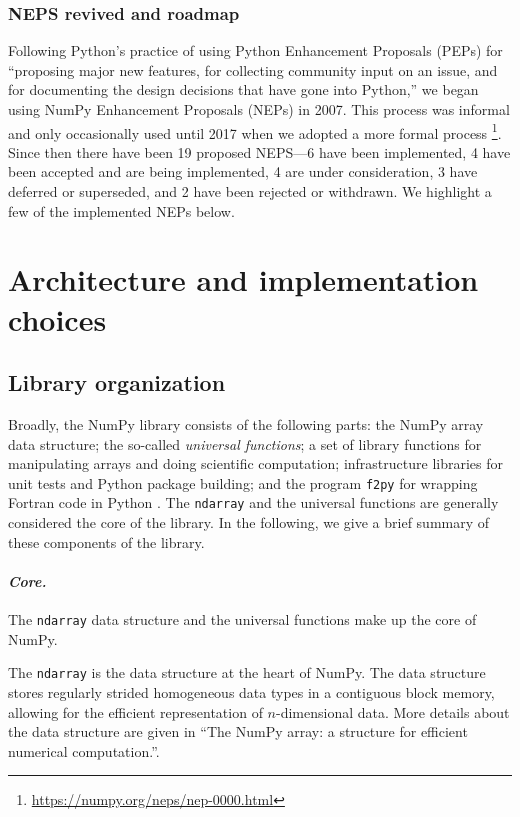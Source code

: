 \documentclass[fleqn,10pt]{wlscirep}
\newcommand{\code}[1]{\texttt{#1}}
\begin{document}
\subsubsection*{NEPS revived and roadmap}

Following Python's practice of using Python Enhancement Proposals (PEPs) for
``proposing major new features, for collecting community input on an
issue, and for documenting the design decisions that have gone into Python,''
we began using NumPy Enhancement Proposals (NEPs) in 2007.
This process was informal and only occasionally used until 2017 when
we adopted a more formal process \footnote{\url{https://numpy.org/neps/nep-0000.html}}.
Since then there have been 19 proposed NEPS---6 have been implemented,
4 have been accepted and are being implemented, 4 are under consideration,
3 have deferred or superseded, and 2 have been rejected or withdrawn.
We highlight a few of the implemented NEPs below.



\section*{Architecture and implementation choices}


\subsection*{Library organization}
Broadly, the NumPy library consists of the following parts:
the NumPy array data structure; the so-called \emph{universal functions};
a set of library functions for manipulating arrays and doing scientific
computation; infrastructure libraries for unit tests and Python package
building; and the program \code{f2py} for wrapping Fortran code in Python \cite{peterson2009f2py}.
The \code{ndarray} and the universal functions are generally considered
the core of the library.
In the following, we give a brief summary of these components of the
library.

\paragraph{\emph{Core.}}  The \code{ndarray} data structure and the
universal functions make up the core of NumPy.

The \code{ndarray} is the data structure at the heart of NumPy.
The data structure stores regularly strided homogeneous data types
in a contiguous block memory, allowing for the efficient representation
of $n$-dimensional data.
More details about the data structure are given in ``The NumPy array:
a structure for efficient numerical computation.''\cite{vanderwalt2011numpy}.
\end{document}
